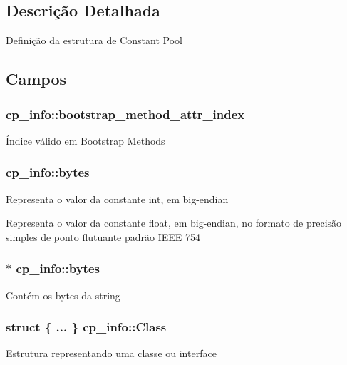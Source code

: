 \subsection{Descrição Detalhada}
Definição da estrutura de Constant Pool 

\subsection{Campos}
\subsubsection[{\texorpdfstring{bootstrap\+\_\+method\+\_\+attr\+\_\+index}{bootstrap_method_attr_index}}]{ cp\+\_\+info\+::bootstrap\+\_\+method\+\_\+attr\+\_\+index}\hypertarget{structcp__info_abad11f89efc244065e72ec811f9dc929}{}\label{structcp__info_abad11f89efc244065e72ec811f9dc929}
Índice válido em Bootstrap Methods 
\subsubsection[{\texorpdfstring{bytes}{bytes}}]{ cp\+\_\+info\+::bytes}\hypertarget{structcp__info_a4dcce18f4a19e8112079dc11dc2f5386}{}\label{structcp__info_a4dcce18f4a19e8112079dc11dc2f5386}
Representa o valor da constante int, em big-\/endian

Representa o valor da constante float, em big-\/endian, no formato de precisão simples de ponto flutuante padrão I\+E\+EE 754 
\subsubsection[{\texorpdfstring{bytes}{bytes}}]{$\ast$ cp\+\_\+info\+::bytes}\hypertarget{structcp__info_a30f97eda54e30a923a217520316e9301}{}\label{structcp__info_a30f97eda54e30a923a217520316e9301}
Contém os bytes da string 
\subsubsection[{\texorpdfstring{Class}{Class}}]{\setlength{\rightskip}{0pt plus 5cm}struct \{ ... \}   cp\+\_\+info\+::\+Class}\hypertarget{structcp__info_aa2cc42e313a1550a5f5e8c0d7ffc58ee}{}\label{structcp__info_aa2cc42e313a1550a5f5e8c0d7ffc58ee}
Estrutura representando uma classe ou interface 
